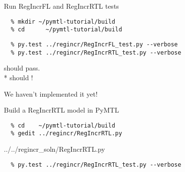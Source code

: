 
\section[{\it Hands-On} RegIncr]{}

\begin{task}\begin{frame}[fragile]{Run RegIncrFL and RegIncrRTL tests}
\begin{verbatim}
  % mkdir ~/pymtl-tutorial/build
  % cd      ~/pymtl-tutorial/build
\end{verbatim}

\begin{verbatim}
  % py.test ../regincr/RegIncrFL_test.py --verbose
  % py.test ../regincr/RegIncrRTL_test.py --verbose
\end{verbatim}

\begin{centering}
 should pass. \\*
 should !

\vspace{0.4in}
We haven't implemented it yet!

\end{centering}

\end{frame}
\end{task}

\begin{task}\begin{frame}[fragile]{Build a RegIncrRTL model in PyMTL}
\vspace{-0.25in}
\begin{verbatim}
  % cd    ~/pymtl-tutorial/build
  % gedit ../regincr/RegIncrRTL.py
\end{verbatim}

\vspace{-0.3in}
%
{../../regincr_soln/RegIncrRTL.py}%

\vspace{-0.3in}
\begin{verbatim}
  % py.test ../regincr/RegIncrRTL_test.py --verbose
\end{verbatim}
\end{frame}
\end{task}

